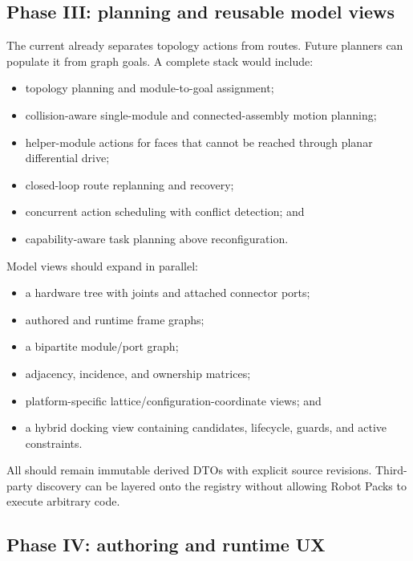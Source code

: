 \subsection{Phase III: planning and reusable model views}

The current  already separates topology actions from routes.
Future planners can populate it from graph goals. A complete stack would include:

\begin{itemize}
  \item topology planning and module-to-goal assignment;
  \item collision-aware single-module and connected-assembly motion planning;
  \item helper-module actions for faces that cannot be reached through planar
        differential drive;
  \item closed-loop route replanning and recovery;
  \item concurrent action scheduling with conflict detection; and
  \item capability-aware task planning above reconfiguration.
\end{itemize}

Model views should expand in parallel:

\begin{itemize}
  \item a hardware tree with joints and attached connector ports;
  \item authored and runtime frame graphs;
  \item a bipartite module/port graph;
  \item adjacency, incidence, and ownership matrices;
  \item platform-specific lattice/configuration-coordinate views; and
  \item a hybrid docking view containing candidates, lifecycle, guards, and active
        constraints.
\end{itemize}

All should remain immutable derived DTOs with explicit source revisions. Third-party
discovery can be layered onto the registry without allowing Robot Packs to execute
arbitrary code.

\subsection{Phase IV: authoring and runtime UX}

